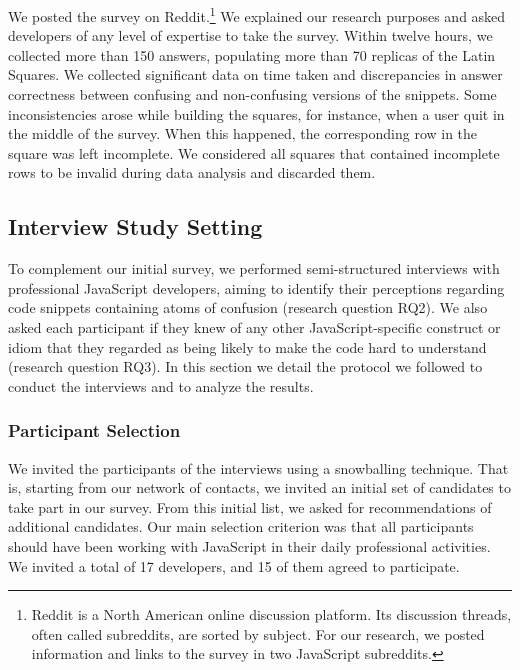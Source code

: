 We posted the survey on Reddit.\footnote{Reddit is a North American online discussion platform.
Its discussion threads, often called subreddits, are sorted by subject. For our research, we posted information and links to the survey in two JavaScript subreddits.} We explained our research purposes and asked developers of any level of expertise to take the survey. Within twelve hours, we collected more than 150 answers, populating more than 70 replicas of the Latin Squares. We collected significant data on time taken and discrepancies in answer correctness between confusing and non-confusing versions of the snippets. Some inconsistencies arose while building the squares, for instance, when a user quit in the middle of the survey. When this happened, the corresponding row in the square was left incomplete. We considered all squares that contained incomplete rows to be invalid during data analysis and discarded them. 

 
\subsection{Interview Study Setting}

To complement our initial survey, we performed semi-structured interviews with professional JavaScript developers, aiming to identify their perceptions regarding code snippets containing atoms of confusion (research question RQ2). We also asked each participant if they knew of any other JavaScript-specific construct or idiom that they regarded as being likely to make the code hard to understand (research question RQ3). In this section we detail the protocol we followed to conduct the interviews and to analyze the results.


\subsubsection*{Participant Selection} We invited the participants of the interviews using a snowballing technique. That is, starting from our network of contacts, we invited an initial set of candidates to take part in our survey. From this initial list, we asked for recommendations of additional candidates. Our main selection criterion was that all participants should have been working with JavaScript in their daily professional activities. We invited a total of 17 developers, and 15 of them agreed to participate.



